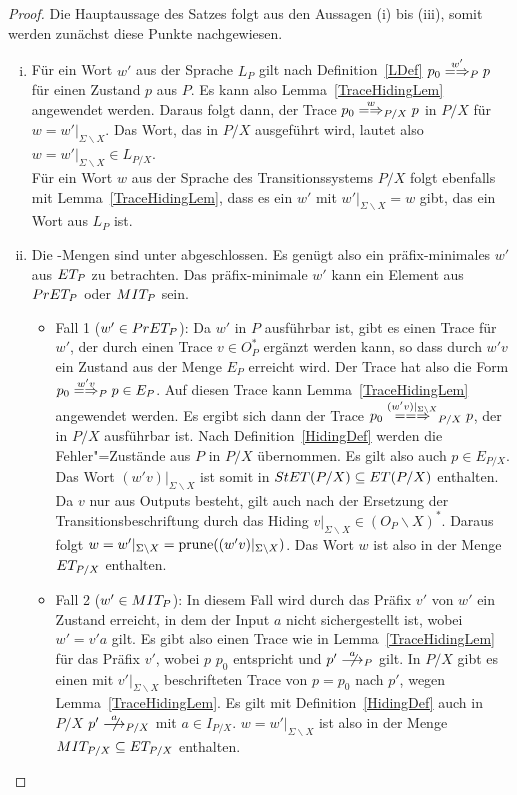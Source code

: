 \begin{proof}
  Die Hauptaussage des Satzes folgt aus den Aussagen (i) bis (iii), somit
  werden zunächst diese Punkte nachgewiesen.
  \begin{enumerate}[(i)]
    \item Für ein Wort $w'$ aus der Sprache $L_P$ gilt nach
      Definition~\ref{LDef} $p_0 \weakmay[w']_P p$ für einen Zustand $p$ aus
      $P$. Es kann also Lemma~\ref{TraceHidingLem} angewendet werden. Daraus
      folgt dann, der Trace $p_0 \weakmay[w]_{P/X} p$ in $P/X$ für
      $w=w'|_{\Sigma\backslash X}$. Das Wort, das in $P/X$ ausgeführt wird,
      lautet also $w=w'|_{\Sigma\backslash X}\in L_{P/X}$.\\
      Für ein Wort $w$ aus der Sprache des Transitionssystems $P/X$ folgt
      ebenfalls mit Lemma~\ref{TraceHidingLem}, dass es ein $w'$ mit
      $w'|_{\Sigma\backslash X} = w$ gibt, das ein Wort aus $L_P$ ist.
    \item Die \ET{}-Mengen sind unter \cont{} abgeschlossen. Es genügt also ein
      präfix-minimales $w'$ aus $ET _{P}$ zu betrachten. Das präfix-minimale
      $w'$ kann ein Element aus $PrET _P$ oder $MIT _P$ sein.
      \begin{itemize}
        \item Fall 1 ($w'\in PrET _P$): Da $w'$ in $P$ ausführbar ist, gibt es
          einen Trace für $w'$, der durch einen Trace $v \in O_P^*$ ergänzt
          werden kann, so dass durch $w'v$ ein Zustand aus der Menge $E_P$
          erreicht wird. Der Trace hat also die Form $p_0 \weakmay[w'v]_P p\in
          E_P$. Auf diesen Trace kann Lemma~\ref{TraceHidingLem} angewendet
          werden. Es ergibt sich dann der Trace $p_0 \lweakmay[(w'v)|_{\Sigma
          \backslash X}]_{P/X} p$, der in $P/X$ ausführbar ist. Nach
          Definition~\ref{HidingDef} werden die Fehler"=Zustände aus $P$ in
          $P/X$ übernommen. Es gilt also auch $p\in E_{P/X}$. Das Wort
          $(w'v)|_{\Sigma\backslash X}$ ist somit in $StET (P/X) \subseteq ET
          (P/X)$ enthalten. Da $v$ nur aus Outputs besteht, gilt auch nach der
          Ersetzung der Transitionsbeschriftung durch das Hiding
          $v|_{\Sigma\backslash X}\in (O_P\backslash X)^*$. Daraus folgt $w =
          w'|_{\Sigma\backslash X} = \mathrm{prune} ((w'v)|_{\Sigma\backslash X})$. Das
          Wort $w$ ist also in der Menge $ET _{P/X}$ enthalten.
        \item Fall 2 ($w'\in MIT _P$): In diesem Fall wird durch das Präfix
          $v'$ von $w'$ ein Zustand erreicht, in dem der Input $a$ nicht
          sichergestellt ist, wobei $w'=v'a$ gilt. Es gibt also einen Trace wie
          in Lemma~\ref{TraceHidingLem} für das Präfix $v'$, wobei $p$ $p_0$
          entspricht und $p'\nmust[a]_P$ gilt. In $P/X$ gibt es einen mit
          $v'|_{\Sigma\backslash X}$ beschrifteten Trace von $p = p_0$ nach
          $p'$, wegen Lemma~\ref{TraceHidingLem}. Es gilt mit
          Definition~\ref{HidingDef} auch in $P/X$ $p'\nmust[a]_{P/X}$ mit
          $a\in I_{P/X}$. $w = w'|_{\Sigma\backslash X}$ ist also in der Menge
          $MIT _{P/X} \subseteq ET _{P/X}$ enthalten.
      \end{itemize}


\end{enumerate}
\end{proof}

